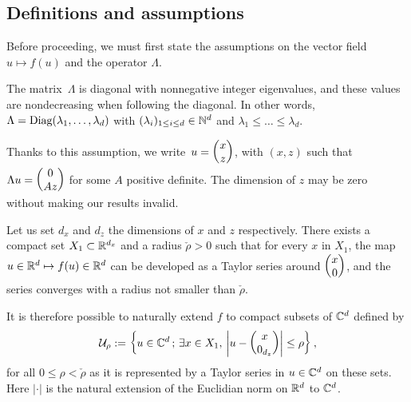 \subsection{Definitions and assumptions} \label{sec:mima:subsec:def}

Before proceeding, we must first state the assumptions on the vector field $u \mapsto f(u)$ and the operator $\Lambda$. 
\begin{assumption} \label{sec:mima:subsec:hyp:integer}
    The matrix~$\Lambda$ is diagonal with nonnegative integer eigenvalues, 
    and these values are nondecreasing when following the diagonal.
    In other words,
    $ \Lambda = \textup{Diag}(\lambda_1, \ldots, \lambda_d) $
    with $(\lambda_i)_{1 \leq i \leq d} \in \mathbb{N}^d$ and 
    $\lambda_1 \leq \dots \leq \lambda_d$. 
\end{assumption}
Thanks to this assumption, we write~$u = \begin{pmatrix} x \\ z \end{pmatrix}$, with $(x,z)$ 
such that $\Lambda u = \begin{pmatrix} 0 \\ Az \end{pmatrix}$ for some $A$ positive definite.
The dimension of $z$ may be zero without making our results invalid.


\begin{assumption} \label{approx_hyp:f_poly}
Let us set $d_x$ and $d_z$ the dimensions of $x$ and $z$ respectively. 
There exists a compact set $X_1 \subset \mathbb{R}^{d_x}$ and a radius $\check{\rho} > 0$ 
such that for every $x$ in $X_1$, the map $u \in \mathbb{R}^d \mapsto f(u) \in \mathbb{R}^d $ 
can be developed as a Taylor series around $\begin{pmatrix} x \\ 0 \end{pmatrix}$, 
and the series converges with a radius not smaller than $\check{\rho}$. 
\end{assumption}

It is therefore possible to naturally extend $f$ to compact subsets of 
$ \mathbb{C}^d $ defined by 
\begin{equation*} \label{approx_def:U_rho} 
\mathcal{U}_{\rho} := \left\{ u \in \mathbb{C}^d \,;\, \exists x \in X_1,\, \left| u - \begin{pmatrix} x \\ 0_{d_z} \end{pmatrix} \right| \leq \rho \right\} , 
\end{equation*} 
for all $0 \leq \rho < \check{\rho}$ as it is represented by a Taylor series in $u\in \mathbb{C}^d$ on these sets. 
%
Here $| \cdot |$ is the natural extension of the Euclidian norm on $\mathbb{R}^d$ to $\mathbb{C}^d$. 

%


